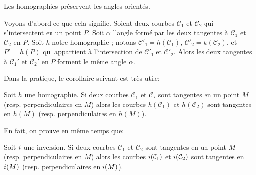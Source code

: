 \documentclass[11pt,class=report,crop=false]{standalone}
\begin{document}
\begin{theoreme}
\label{th:angle}
Les homographies préservent les angles orientés. 
\end{theoreme}

Voyons d'abord ce que cela signifie. Soient deux courbes $\mathcal{C}_1$ et $\mathcal{C}_2$
qui s'intersectent en un point $P$. Soit $\alpha$ l'angle formé par les deux tangentes à $\mathcal{C}_1$ et $\mathcal{C}_2$ en $P$.
Soit $h$ notre homographie ; notons $\mathcal{C}'_1 = h(\mathcal{C}_1)$,
$\mathcal{C}'_2 = h(\mathcal{C}_2)$, et $P' = h(P)$ qui appartient à l'intersection
de $\mathcal{C}'_1$ et $\mathcal{C}'_2$. Alors les deux tangentes à $\mathcal{C}_1'$ et $\mathcal{C}_2'$ en $P$
forment le même angle $\alpha$.

Dans la pratique, le corollaire suivant est très utile:
\begin{corollaire}
Soit $h$ une homographie. Si deux courbes $\mathcal{C}_1$ et $\mathcal{C}_2$ sont tangentes
en un point $M$ (resp. perpendiculaires en $M$) alors les courbes
$h(\mathcal{C}_1)$ et $h(\mathcal{C}_2)$ sont tangentes en $h(M)$
(resp. perpendiculaires en $h(M)$).
\end{corollaire}

En fait, on prouve en même temps que:
\begin{corollaire}
Soit $i$ une inversion. Si deux courbes $\mathcal{C}_1$ et $\mathcal{C}_2$ sont tangentes
en un point $M$ (resp. perpendiculaires en $M$) alors les courbes
$i(\mathcal{C}_1)$ et $i(\mathcal{C}_2)$ sont tangentes en $i(M)$
(resp. perpendiculaires en $i(M)$).
\end{corollaire}
\end{document}
